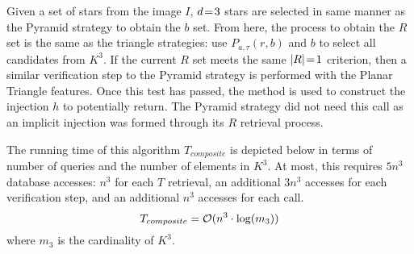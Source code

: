Given a set of stars from the image $I$, $d \!=\! 3$ stars are selected in same manner as the Pyramid strategy to obtain
the $b$ set.
From here, the process to obtain the $R$ set is the same as the triangle strategies: use $P_{a, \tau}(r, b)$ and $b$ to
select all candidates from $K^3$.
If the current $R$ set meets the same $\left| R \right| \!=\! 1$ criterion, then a similar verification step to the Pyramid
strategy is performed with the Planar Triangle features.
Once this test has passed, the  method is used to construct the injection $h$ to potentially return.
The Pyramid strategy did not need this call as an implicit injection was formed through its $R$ retrieval process.

The running time of this algorithm $T_{composite}$ is depicted below in terms of number of queries and the number
of elements in $K^3$.
At most, this requires $5n^3$ database accesses: $n^3$ for each $T$ retrieval, an additional $3n^3$ accesses for each
verification step, and an additional $n^3$ accesses for each  call.
\begin{equation}
    T_{composite} = \mathcal{O} (n^3 \cdot \log(m_3))
\end{equation}
where $m_3$ is the cardinality of $K^3$.


%    
